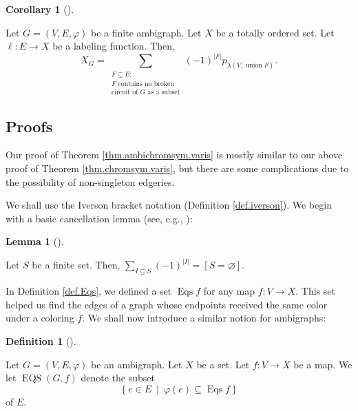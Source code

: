 \documentclass[numbers=enddot,12pt,final,onecolumn,notitlepage]{scrartcl}%
\theoremstyle{definition}
\newtheorem{lem}[theo]{Lemma}
\newenvironment{lemma}[1][]
{\begin{lem}[#1]\begin{leftbar}}
{\end{leftbar}\end{lem}}
\newtheorem{defi}[theo]{Definition}
\newenvironment{definition}[1][]
{\begin{defi}[#1]\begin{leftbar}}
{\end{leftbar}\end{defi}}
\newtheorem{coro}[theo]{Corollary}
\newenvironment{corollary}[1][]
{\begin{coro}[#1]\begin{leftbar}}
{\end{leftbar}\end{coro}}
\let\sumnonlimits\sum
\renewcommand{\sum}{\sumnonlimits\limits}
\begin{document}
\begin{corollary}
\label{cor.ambichromsym.NBC}Let $G=\left(  V,E,\varphi\right)  $ be a finite
ambigraph. Let $X$ be a totally ordered set. Let $\ell:E\rightarrow X$ be a
labeling function. Then,%
\[
X_{G}=\sum_{\substack{F\subseteq E;\\F\text{ contains no broken}%
\\\text{circuit of }G\text{ as a subset}}}\left(  -1\right)  ^{\left\vert
F\right\vert }p_{\lambda\left(  V,\operatorname*{union}F\right)  }.
\]

\end{corollary}

\subsection{Proofs}

Our proof of Theorem \ref{thm.ambichromsym.varis} is mostly similar to our
above proof of Theorem \ref{thm.chromsym.varis}, but there are some
complications due to the possibility of non-singleton edgeries.

We shall use the Iverson bracket notation (Definition \ref{def.iverson}). We
begin with a basic cancellation lemma (see, e.g., \cite[Proposition
7.8.10]{mps}):

\begin{lemma}
\label{lem.cancel}Let $S$ be a finite set. Then, $\sum_{I\subseteq S}\left(
-1\right)  ^{\left\vert I\right\vert }=\left[  S=\varnothing\right]  $.
\end{lemma}

In Definition \ref{def.Eqs}, we defined a set $\operatorname*{Eqs}f$ for any
map $f:V\rightarrow X$. This set helped us find the edges of a graph whose
endpoints received the same color under a coloring $f$. We shall now introduce
a similar notion for ambigraphs:

\begin{definition}
\label{def.ambiEQS}Let $G=\left(  V,E,\varphi\right)  $ be an ambigraph. Let
$X$ be a set. Let $f:V\rightarrow X$ be a map. We let $\operatorname*{EQS}%
\left(  G,f\right)  $ denote the subset%
\[
\left\{  e\in E\ \mid\ \varphi\left(  e\right)  \subseteq\operatorname*{Eqs}%
f\right\}
\]
of $E$.
\end{definition}
\end{document}
